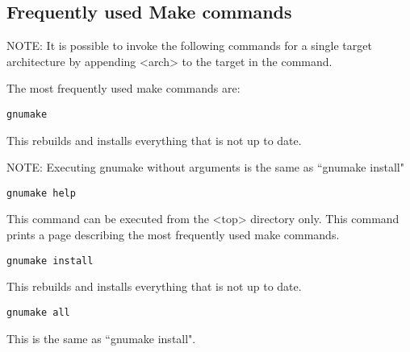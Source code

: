\subsection{Frequently used Make commands }

NOTE: It is possible to invoke the following commands for a single target architecture by appending \textless{}arch\textgreater{} to the target 
in the command. 

The most frequently used make commands are:

\begin{verbatim}gnumake
\end{verbatim}\begin{description}\item This rebuilds and installs everything that is not up to date.

\item NOTE: Executing gnumake without arguments is the same as ``gnumake install"

\item 

\end{description}\begin{verbatim}gnumake help
\end{verbatim}\begin{description}\item This command can be executed from the \textless{}top\textgreater{} directory only. This command prints a page describing the most 
frequently used make commands.

\item 

\end{description}\begin{verbatim}gnumake install
\end{verbatim}\begin{description}\item This rebuilds and installs everything that is not up to date.

\item 

\end{description}\begin{verbatim}gnumake all
\end{verbatim}\begin{description}\item This is the same as ``gnumake install".

\item 


\end{description}
